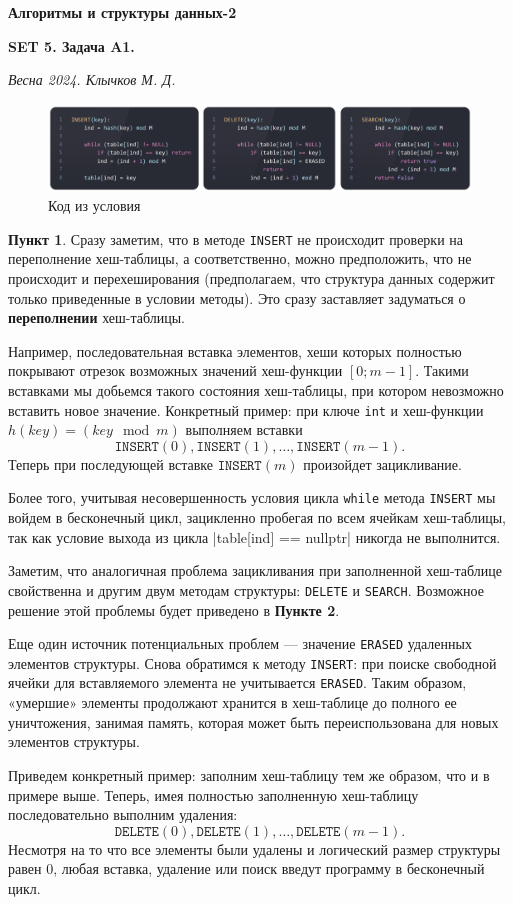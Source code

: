 \documentclass[11pt,a4paper]{scrarticle}
\author{Клычков Максим Дмитриевич}
\theoremstyle{definition}
\newtheorem{subtask}{Пункт}
\begin{document}
\centerline{\textbf{\huge Алгоритмы и структуры данных-2}}
\centerline{\textbf{SET 5. Задача A1.}}
\begin{flushright}
    \emph{Весна 2024. Клычков М. Д.}
\end{flushright}

\begin{figure}[htp]
    \centering
    \includegraphics[width=\textwidth]{static/code.png}
    \caption{Код из условия}
    \label{fig:code}
\end{figure}

\begin{subtask}
    Сразу заметим, что в методе \texttt{INSERT} не происходит проверки на переполнение хеш-таблицы, а соответственно, можно предположить, что не происходит и перехеширования (предполагаем, что структура данных содержит только приведенные в условии методы). Это сразу заставляет задуматься о \textbf{переполнении} хеш-таблицы.

    Например, последовательная вставка элементов, хеши которых полностью покрывают отрезок возможных значений хеш-функции $[0; m - 1]$. Такими вставками мы добьемся такого состояния хеш-таблицы, при котором невозможно вставить новое значение. Конкретный пример:
    при ключе \texttt{int} и хеш-функции $h(key) = (key \mod m)$ выполняем вставки
    $$\texttt{INSERT}(0), \texttt{INSERT}(1), \dots, \texttt{INSERT}(m - 1).$$
    Теперь при последующей вставке $\texttt{INSERT}(m)$ произойдет зацикливание.

    Более того, учитывая несовершенность условия цикла \texttt{while} метода \texttt{INSERT} мы войдем в бесконечный цикл, зацикленно пробегая по всем ячейкам хеш-таблицы, так как условие выхода из цикла
    |table[ind] == nullptr|
    \noindent никогда не выполнится.

    Заметим, что аналогичная проблема зацикливания при заполненной хеш-таблице свойственна и другим двум методам структуры: \texttt{DELETE} и \texttt{SEARCH}. Возможное решение этой проблемы будет приведено в \textbf{Пункте 2}.

    Еще один источник потенциальных проблем — значение \texttt{ERASED} удаленных элементов структуры. Снова обратимся к методу \texttt{INSERT}: при поиске свободной ячейки для вставляемого элемента не учитывается \texttt{ERASED}. Таким образом, «умершие» элементы продолжают хранится в хеш-таблице до полного ее уничтожения, занимая память, которая может быть переиспользована для новых элементов структуры.

    Приведем конкретный пример: заполним хеш-таблицу тем же образом, что и в примере выше. Теперь, имея полностью заполненную хеш-таблицу последовательно выполним удаления:
    $$\texttt{DELETE}(0), \texttt{DELETE}(1), \dots, \texttt{DELETE}(m - 1).$$
    Несмотря на то что все элементы были удалены и логический размер структуры равен $0$, любая вставка, удаление или поиск введут программу в бесконечный цикл.
\end{subtask}
\end{document}
